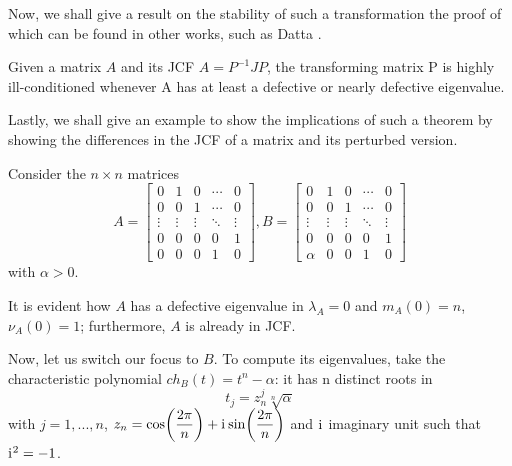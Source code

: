 Now, we shall give a result on the stability of such a transformation the proof of which can be found in other works, such as
Datta \cite{biswadatta}.

\begin{theorem}
    Given a matrix \(A\) and its JCF \(A = P^{-1}JP\), the transforming matrix P is highly ill-conditioned
    whenever A has at least a defective or nearly defective eigenvalue.
\end{theorem}

Lastly, we shall give an example to show the implications of such a theorem by showing the differences in
the JCF of a matrix and its perturbed version.

\begin{example}
Consider the \(n \times n\) matrices
\[
    A =
    \begin{bmatrix}
            0       &      1       &    0     &   \cdots   &    0    \\
            0       &      0       &    1     &   \cdots   &    0    \\
        \vdots      &    \vdots    &  \vdots  &   \ddots   & \vdots  \\
            0       &       0      &     0    &     0      &    1    \\
            0       &       0      &     0    &     1      &    0
    \end{bmatrix},
    B =
    \begin{bmatrix}
        0       &      1       &    0     &   \cdots   &    0    \\
        0       &      0       &    1     &   \cdots   &    0    \\
     \vdots     &    \vdots    &  \vdots  &   \ddots   & \vdots  \\
        0       &       0      &     0    &     0      &    1    \\
      \alpha    &       0      &     0    &     1      &    0
    \end{bmatrix}
\]
with \(\alpha > 0\).

It is evident how \(A\) has a defective eigenvalue in \(\lambda_{A} = 0\) and \(m_{A}(0) = n\), \(\nu_{A}(0) = 1\); furthermore,
\(A\) is already in JCF.

Now, let us switch our focus to \(B\). To compute its eigenvalues, take the characteristic polynomial
\(ch_{B}(t) = t^n - \alpha\): it has n distinct roots in
\[
    t_{j} = z_{n}^{j} \sqrt[n]{\alpha}
\]
with \(j = 1, ..., n\), \(z_{n} = \cos(\dfrac{2\pi}{n}) + \mathrm{i}\mkern1mu \sin(\dfrac{2\pi}{n})\) and
\(\mathrm{i}\mkern1mu\) imaginary unit such that \(\mathrm{i}\mkern1mu^2 = -1\).


\end{example}
